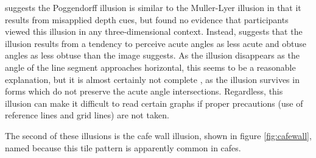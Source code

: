 \documentclass[11pt]{isuthesis}\usepackage[]{graphicx}\usepackage[]{color}
\begin{document}
\citet{gregory1963distortion, gregory1997knowledge} suggests the Poggendorff illusion is similar to the Muller-Lyer illusion in that it results from misapplied depth cues, but \citet{green1963poggendorff, ward1977case} found no evidence that participants viewed this illusion in any three-dimensional context. Instead, \citet{green1963poggendorff} suggests that the illusion results from a tendency to perceive acute angles as less acute and obtuse angles as less obtuse than the image suggests. As the illusion disappears as the angle of the line segment approaches horizontal, this seems to be a reasonable explanation, but it is almost certainly not complete \citep{morgan1999poggendorff}, as the illusion survives in forms which do not preserve the acute angle intersections. Regardless, this illusion can make it difficult to read certain graphs \citep{amer2005bias, poulton1985geometric} if proper precautions (use of reference lines and grid lines) are not taken.

The second of these illusions is the cafe wall illusion, shown in figure \ref{fig:cafewall}, named because this tile pattern is apparently common in cafes. 
\end{document}

